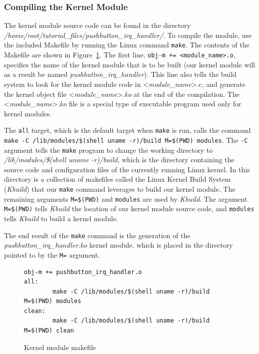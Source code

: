 \documentclass[11pt, twoside, pdftex]{article}
\begin{document}
\subsubsection{Compiling the Kernel Module}

The kernel module source code can be found in the directory
\textit{/home/root/tutorial\_files/pushbutton\_irq\_handler/}. To compile the module, use 
the included Makefile by running the Linux command \texttt{make}. The contents of the Makefile are 
shown in Figure~\ref{fig:pushbutton_irq_handler_makefile}. The first line, 
\texttt{obj-m += <module\_name>.o}, specifies the name of the kernel module that is to be 
built (our kernel module will as a result be named \textit{pushbutton\_irq\_handler}). This 
line also tells the build system to look for the kernel module code in <{\it module\_name}>.c, 
and generate the kernel object file <{\it module\_name}>.{\it ko} at the end of the compilation.
The <{\it module\_name}>.{\it ko} file is a special type of executable program used only
for kernel modules. 

The \texttt{all} target, which is the default target when \texttt{make} is run, calls the 
command \texttt{make -C /lib/modules/\-\$(shell uname -r)/build M=\$(PWD) modules}. 
The \texttt{-C} argument tells the \texttt{make} program to change the working directory 
to \textit{/lib/modules/\$(shell uname -r)/build}, which is the directory containing the source 
code and configuration files of the currently running Linux kernel. In this directory is a 
collection of makefiles called the Linux Kernel Build System (\textit{Kbuild}) that our 
\texttt{make} command leverages to build our kernel module. The remaining arguments 
\texttt{M=\$(PWD)} and \texttt{modules} are used by \textit{Kbuild}.  The argument 
\texttt{M=\$(PWD)} tells \textit{Kbuild} the location of our kernel module source code, 
and \texttt{modules} tells \textit{Kbuild} to build a kernel module. 

The end result of the \texttt{make} command is the generation of 
the \textit{pushbutton\_irq\_handler.ko} kernel module, which is placed in the directory pointed 
to by the \texttt{M=} argument.

\lstset{language=make,numbers=left}
\begin{figure}[H]
\begin{center}
\begin{minipage}[t]{16 cm}
\begin{lstlisting}
obj-m += pushbutton_irq_handler.o
all:
        make -C /lib/modules/$(shell uname -r)/build M=$(PWD) modules
clean:
        make -C /lib/modules/$(shell uname -r)/build M=$(PWD) clean
\end{lstlisting}
\end{minipage}
\end{center}
\caption{Kernel module makefile}
\label{fig:pushbutton_irq_handler_makefile}
\end{figure}
\end{document}
